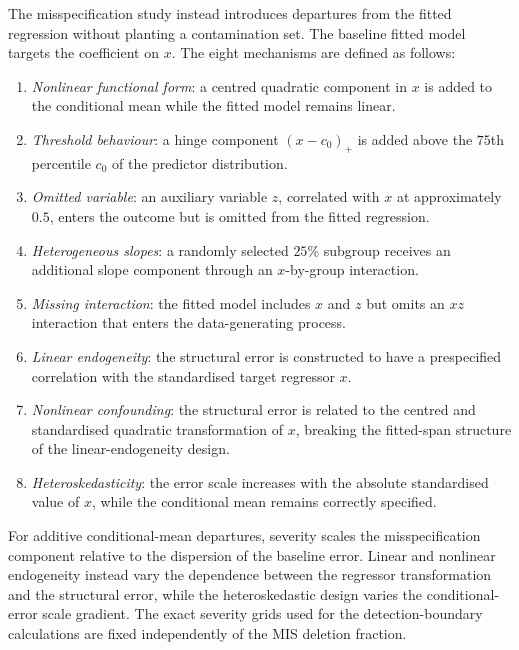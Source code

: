 \documentclass[../main.tex]{subfiles}
\begin{document}
The misspecification study instead introduces departures from the fitted regression without planting a contamination set. The baseline fitted model targets the coefficient on \(x\). The eight mechanisms are defined as follows:
\begin{enumerate}
	\item \emph{Nonlinear functional form}: a centred quadratic component in \(x\) is added to the conditional mean while the fitted model remains linear.
	
	\item \emph{Threshold behaviour}: a hinge component \((x-c_0)_+\) is added above the \(75\)th percentile \(c_0\) of the predictor distribution.
	
	\item \emph{Omitted variable}: an auxiliary variable \(z\), correlated with \(x\) at approximately \(0.5\), enters the outcome but is omitted from the fitted regression.
	
	\item \emph{Heterogeneous slopes}: a randomly selected \(25\%\) subgroup receives an additional slope component through an \(x\)-by-group interaction.
	
	\item \emph{Missing interaction}: the fitted model includes \(x\) and \(z\) but omits an \(x z\) interaction that enters the data-generating process.
	
	\item \emph{Linear endogeneity}: the structural error is constructed to have a prespecified correlation with the standardised target regressor \(x\).
	
	\item \emph{Nonlinear confounding}: the structural error is related to the centred and standardised quadratic transformation of \(x\), breaking the fitted-span structure of the linear-endogeneity design.
	
	\item \emph{Heteroskedasticity}: the error scale increases with the absolute standardised value of \(x\), while the conditional mean remains correctly specified.
\end{enumerate}

For additive conditional-mean departures, severity scales the misspecification component relative to the dispersion of the baseline error. Linear and nonlinear endogeneity instead vary the dependence between the regressor transformation and the structural error, while the heteroskedastic design varies the conditional-error scale gradient. The exact severity grids used for the detection-boundary calculations are fixed independently of the MIS deletion fraction.
\end{document}
